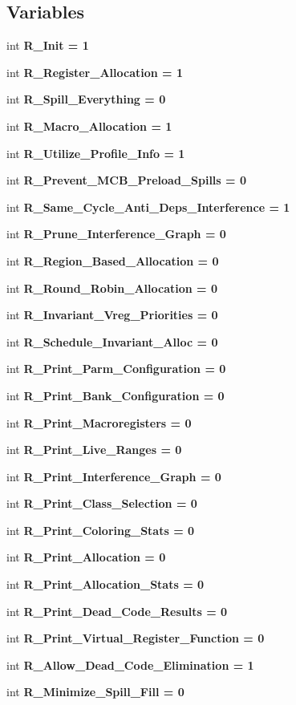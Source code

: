 \subsection*{Variables}
\begin{CompactItemize}
\item 
int \bf{R\_\-Init} = 1
\item 
int \bf{R\_\-Register\_\-Allocation} = 1
\item 
int \bf{R\_\-Spill\_\-Everything} = 0
\item 
int \bf{R\_\-Macro\_\-Allocation} = 1
\item 
int \bf{R\_\-Utilize\_\-Profile\_\-Info} = 1
\item 
int \bf{R\_\-Prevent\_\-MCB\_\-Preload\_\-Spills} = 0
\item 
int \bf{R\_\-Same\_\-Cycle\_\-Anti\_\-Deps\_\-Interference} = 1
\item 
int \bf{R\_\-Prune\_\-Interference\_\-Graph} = 0
\item 
int \bf{R\_\-Region\_\-Based\_\-Allocation} = 0
\item 
int \bf{R\_\-Round\_\-Robin\_\-Allocation} = 0
\item 
int \bf{R\_\-Invariant\_\-Vreg\_\-Priorities} = 0
\item 
int \bf{R\_\-Schedule\_\-Invariant\_\-Alloc} = 0
\item 
int \bf{R\_\-Print\_\-Parm\_\-Configuration} = 0
\item 
int \bf{R\_\-Print\_\-Bank\_\-Configuration} = 0
\item 
int \bf{R\_\-Print\_\-Macroregisters} = 0
\item 
int \bf{R\_\-Print\_\-Live\_\-Ranges} = 0
\item 
int \bf{R\_\-Print\_\-Interference\_\-Graph} = 0
\item 
int \bf{R\_\-Print\_\-Class\_\-Selection} = 0
\item 
int \bf{R\_\-Print\_\-Coloring\_\-Stats} = 0
\item 
int \bf{R\_\-Print\_\-Allocation} = 0
\item 
int \bf{R\_\-Print\_\-Allocation\_\-Stats} = 0
\item 
int \bf{R\_\-Print\_\-Dead\_\-Code\_\-Results} = 0
\item 
int \bf{R\_\-Print\_\-Virtual\_\-Register\_\-Function} = 0
\item 
int \bf{R\_\-Allow\_\-Dead\_\-Code\_\-Elimination} = 1
\item 
int \bf{R\_\-Minimize\_\-Spill\_\-Fill} = 0
\item 

\end{CompactItemize}
